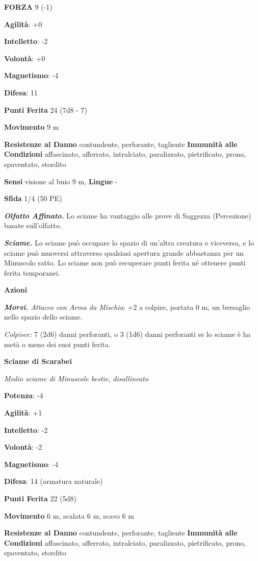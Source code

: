 \begin{multicols}{2}
\textbf{FORZA} 9 (-1)

\textbf{Agilità}: +0

\textbf{Intelletto}: -2

\textbf{Volontà}: +0

\textbf{Magnetismo}: -4

\textbf{Difesa}: 11

\textbf{Punti Ferita} 24 (7d8 - 7)

\textbf{Movimento} 9 m

\textbf{Resistenze al Danno} contundente, perforante, tagliente
\textbf{Immunità alle Condizioni} affascinato, afferrato, intralciato,
paralizzato, pietrificato, prono, spaventato, stordito

\textbf{Sensi} visione al buio 9 m, 
\textbf{Lingue} -

\textbf{Sfida} 1/4 (50 PE)

\emph{\textbf{Olfatto Affinato.}} Lo sciame ha vantaggio alle prove di
Saggezza (Percezione) basate sull'olfatto.

\emph{\textbf{Sciame.}} Lo sciame può occupare lo spazio di un'altra
creatura e viceversa, e lo sciame può muoversi attraverso qualsiasi
apertura grande abbastanza per un Minuscolo ratto. Lo sciame non può
recuperare punti ferita né ottenere punti ferita temporanei.

\textbf{Azioni}

\emph{\textbf{Morsi.} Attacco con Arma da Mischia}: +2 a colpire,
portata 0 m, un bersaglio nello spazio dello sciame.

\emph{Colpisce:} 7 (2d6) danni perforanti, o 3 (1d6) danni perforanti se
lo sciame è ha metà o meno dei suoi punti ferita.

\textbf{Sciame di Scarabei}

\emph{Medio sciame di Minuscole bestie, disallineato}

\textbf{Potenza}: -4

\textbf{Agilità}: +1

\textbf{Intelletto}: -2

\textbf{Volontà}: -2

\textbf{Magnetismo}: -4

\textbf{Difesa}: 14 (armatura naturale)

\textbf{Punti Ferita} 22 (5d8)

\textbf{Movimento} 6 m, scalata 6 m, scavo 6 m

\textbf{Resistenze al Danno} contundente, perforante, tagliente
\textbf{Immunità alle Condizioni} affascinato, afferrato, intralciato,
paralizzato, pietrificato, prono, spaventato, stordito


\end{multicols}
